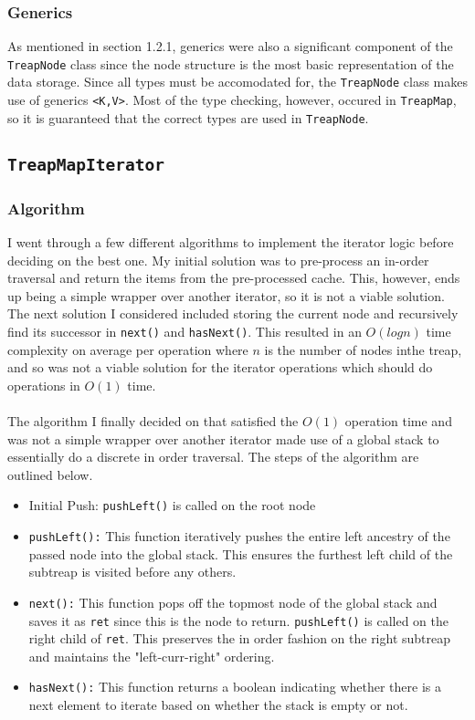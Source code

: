 \documentclass[11pt]{article}
\def\tt{\texttt}
\def\TM{\tt{TreapMap}}
\def\tn{\tt{TreapNode}}
\def\tmi{\tt{TreapMapIterator}}
\begin{document}
\subsubsection{Generics}
As mentioned in section 1.2.1, generics were also a significant component of the \tn{} class since the node structure is the most basic representation of the data storage. Since all types must be accomodated for, the \tn{} class makes use of generics \tt{<K,V>}. Most of the type checking, however, occured in \TM{}, so it is guaranteed that the correct types are used in \tn{}. 
\subsection{\tmi}
\subsubsection{Algorithm}
I went through a few different algorithms to implement the iterator logic before deciding on the best one. My initial solution was to pre-process an in-order traversal and return the items from the pre-processed cache. This, however, ends up being a simple wrapper over another iterator, so it is not a viable solution. The next solution I considered included storing the current node and recursively find its successor in \tt{next()} and \tt{hasNext()}. This resulted in an $O(logn)$ time complexity on average per operation where $n$ is the number of nodes inthe treap, and so was not a viable solution for the iterator operations which should do operations in $O(1)$ time. \\ \\
The algorithm I finally decided on that satisfied the $O(1)$ operation time and was not a simple wrapper over another iterator made use of a global stack to essentially do a discrete in order traversal. The steps of the algorithm are outlined below.
\begin{itemize}
	\item Initial Push: \tt{pushLeft()} is called on the root node
	\item \tt{pushLeft():} This function iteratively pushes the entire left ancestry of the passed node into the global stack. This ensures the furthest left child of the subtreap is visited before any others. 
	\item \tt{next():} This function pops off the topmost node of the global stack and saves it as \tt{ret} since this is the node to return. \tt{pushLeft()} is called on the right child of \tt{ret}. This preserves the in order fashion on the right subtreap and maintains the "left-curr-right" ordering.
	\item \tt{hasNext():} This function returns a boolean indicating whether there is a next element to iterate based on whether the stack is empty or not. 
\end{itemize}
\end{document}
